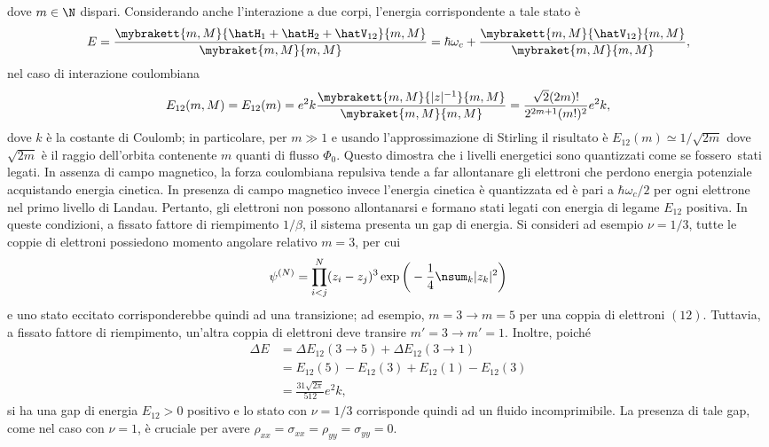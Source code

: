 dove $m \in \N$ dispari. Considerando anche l'interazione a due corpi, l'energia corrispondente a tale stato è 
\begin{equation}
    E = \frac{\mybrakett{m,M}{\hatH_1 + \hatH_2 + \hatV_{12}}{m,M}}{\mybraket{m,M}{m,M}} = \hbar\omega_c + \frac{\mybrakett{m,M}{\hatV_{12}}{m,M}}{\mybraket{m,M}{m,M}},
\end{equation}
nel caso di interazione coulombiana
\begin{equation}
    E_{12}(m,M) = E_{12}(m) = e^2k\frac{\mybrakett{m,M}{|z|^{-1}}{m,M}}{\mybraket{m,M}{m,M}} = \frac{\sqrt{2}(2m)!}{2^{2m + 1}(m!)^2}e^2k,
\end{equation}
dove $k$ è la costante di Coulomb; in particolare, per $m \gg 1$ e usando l'approssimazione di Stirling il risultato è $E_{12}(m) \simeq 1/\sqrt{2m}$ dove $\sqrt{2m}$ è il raggio dell'orbita contenente $m$ quanti di flusso $\Phi_0$. Questo dimostra che i livelli energetici sono quantizzati come se fossero\ stati legati. In assenza di campo magnetico, la forza coulombiana repulsiva tende a far allontanare gli elettroni che perdono energia potenziale acquistando energia cinetica. In presenza di campo magnetico invece l'energia cinetica è quantizzata ed è pari a $\hbar\omega_c/2$ per ogni elettrone nel primo livello di Landau. Pertanto, gli elettroni non possono allontanarsi e formano stati legati con energia di legame $E_{12}$ positiva. In queste condizioni, a fissato fattore di riempimento $1/\beta$, il sistema presenta un gap di energia. Si consideri ad esempio $\nu = 1/3$, tutte le coppie di elettroni possiedono momento angolare relativo $m = 3$, per cui
\begin{equation}
    \psi^{(N)} = \prod_{i < j}^N(z_i - z_j)^3\exp{\bigg(-\frac{1}{4}\nsum_k|z_k|^2\bigg)}
\end{equation}
e uno stato eccitato corrisponderebbe quindi ad una transizione; ad esempio, $m = 3 \to m = 5$ per una coppia di elettroni $(12)$. Tuttavia, a fissato fattore di riempimento, un'altra coppia di elettroni deve transire $m'=3 \to m'=1$. Inoltre, poiché
\begin{align}
    \Delta E &= \Delta E_{12}(3 \to 5) + \Delta E_{12}(3 \to 1) \\
    &= E_{12}(5) - E_{12}(3) + E_{12}(1) - E_{12}(3) \\
    &= \frac{31\sqrt{2\pi}}{512}e^2k,
\end{align}
si ha una gap di energia $E_{12} > 0$ positivo e lo stato con $\nu = 1/3$ corrisponde quindi ad un fluido incomprimibile. La presenza di tale gap, come nel caso con $\nu = 1$, è cruciale per avere $\rho_{xx} = \sigma_{xx} = \rho_{yy} = \sigma_{yy} = 0$. 